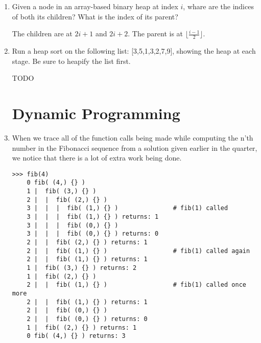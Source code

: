 \documentclass[11pt]{article}
\newenvironment{answer}{\large\lstset{basicstyle=\large}\color{white}}{}
\newenvironment{answer}{\large\lstset{basicstyle=\large}\color{red}}{}
\begin{document}
\begin{enumerate}
\item Given a node in an array-based binary heap at index $i$, whare are the
      indices of both its children? What is the index of its parent?

    \begin{answer}
    The children are at $2i+1$ and $2i+2$. The parent is at
    $\lfloor\frac{i-1}{2}\rfloor$.

    \end{answer}

\item Run a heap sort on the following list: [3,5,1,3,2,7,9], showing the heap
      at each stage. Be sure to heapify the list first.

    \begin{answer}
    \Huge TODO
    \end{answer}

\section*{Dynamic Programming}

\item When we trace all of the function calls being made while computing the
      n'th number in the Fibonacci sequence from a solution given earlier in
      the quarter, we notice that there is a lot of extra work being done.

      

\begin{verbatim}
>>> fib(4)
    0 fib( (4,) {} )
    1 |  fib( (3,) {} )
    2 |  |  fib( (2,) {} )
    3 |  |  |  fib( (1,) {} )               # fib(1) called
    3 |  |  |  fib( (1,) {} ) returns: 1
    3 |  |  |  fib( (0,) {} )
    3 |  |  |  fib( (0,) {} ) returns: 0
    2 |  |  fib( (2,) {} ) returns: 1
    2 |  |  fib( (1,) {} )                  # fib(1) called again
    2 |  |  fib( (1,) {} ) returns: 1
    1 |  fib( (3,) {} ) returns: 2
    1 |  fib( (2,) {} )
    2 |  |  fib( (1,) {} )                  # fib(1) called once more
    2 |  |  fib( (1,) {} ) returns: 1
    2 |  |  fib( (0,) {} )
    2 |  |  fib( (0,) {} ) returns: 0
    1 |  fib( (2,) {} ) returns: 1
    0 fib( (4,) {} ) returns: 3
\end{verbatim}


\end{enumerate}
\end{document}
